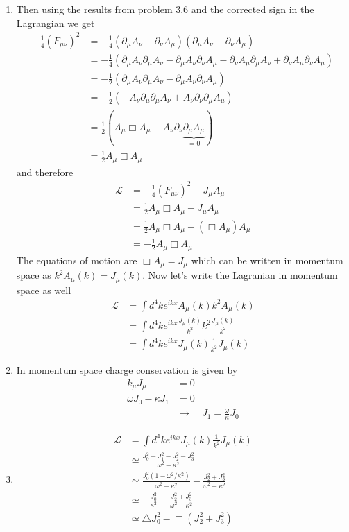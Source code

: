 \documentclass[../main.tex]{subfiles}
\begin{document}
\begin{enumerate}[label=(\alph*)]
\item Then using the results from problem 3.6 and the corrected sign in the Lagrangian we get
\begin{align}
-\frac{1}{4}(F_{\mu\nu})^2
    &=-\frac{1}{4}(\partial_\mu A_\nu-\partial_\nu A_\mu)(\partial_\mu A_\nu-\partial_\nu A_\mu)\\
    &=-\frac{1}{4}\left(\partial_\mu A_\nu \partial_\mu A_\nu-\partial_\mu A_\nu \partial_\nu A_\mu
        -\partial_\nu A_\mu \partial_\mu A_\nu + \partial_\nu A_\mu\partial_\nu A_\mu\right)\\
    &=-\frac{1}{2}\left(\partial_\mu A_\nu \partial_\mu A_\nu-\partial_\mu A_\nu \partial_\nu A_\mu\right)\\
    &=-\frac{1}{2}\left(-A_\nu\partial_\mu\partial_\mu A_\nu+ A_\nu \partial_\nu \partial_\mu A_\mu\right)\\
    &=\frac{1}{2}\left(A_\mu \Box A_\mu- A_\nu \partial_\nu \underbrace{\partial_\mu A_\mu}_{=0}\right)\\ 
    &=\frac{1}{2}A_\mu \Box A_\mu
\end{align}
and therefore
\begin{align}
\mathcal{L}&=-\frac{1}{4}(F_{\mu\nu})^2-J_\mu A_\mu\\
&=\frac{1}{2}A_\mu\Box A_\mu-J_\mu A_\mu\\
&=\frac{1}{2}A_\mu\Box A_\mu-(\Box A_\mu) A_\mu\\
&=-\frac{1}{2}A_\mu\Box A_\mu
\end{align}
The equations of motion are $\Box A_\mu=J_\mu$ which can be written in momentum space as $k^2A_\mu(k)=J_\mu(k)$. Now let's write the Lagranian in momentum space as well
\begin{align}
\mathcal{L}&=\int d^4k e^{ikx}A_\mu(k)k^2A_\mu(k)\\
&=\int d^4k e^{ikx}\frac{J_\mu(k)}{k^2}k^2\frac{J_\mu(k)}{k^2}\\
&=\int d^4k e^{ikx}J_\mu(k)\frac{1}{k^2}J_\mu(k)
\end{align} 
\item In momentum space charge conservation is given by
\begin{align}
  k_\mu J_\mu&=0\\
  \omega J_0-\kappa J_1&=0\\
  &\rightarrow\quad J_1=\frac{\omega}{\kappa}J_0
\end{align}

\item
\begin{align}
\mathcal{L}&=\int d^4k e^{ikx}J_\mu(k)\frac{1}{k^2}J_\mu(k)\\
&\simeq\frac{J_0^2-J_1^2-J_2^2-J_3^2}{\omega^2-\kappa^2}\\
&\simeq\frac{J_0^2(1-\omega^2/\kappa^2)}{\omega^2-\kappa^2}-\frac{J_2^2+J_3^2}{\omega^2-\kappa^2}\\
&\simeq-\frac{J_0^2}{\kappa^2}-\frac{J_2^2+J_3^2}{\omega^2-\kappa^2}\\
&\simeq\triangle J_0^2-\Box(J_2^2+J_3^2)
\end{align} 


\end{enumerate}
\end{document}
